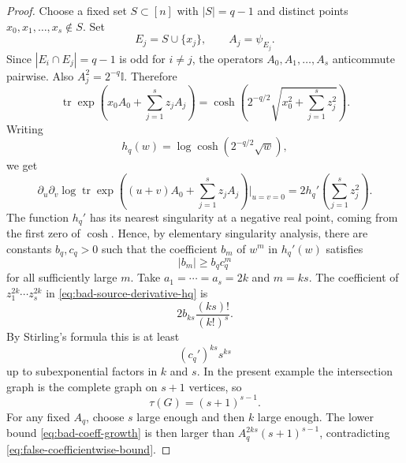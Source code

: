 \documentclass[11pt]{article}
\newcommand{\tr}{\operatorname{tr}}
\newcommand{\I}{\mathbb{I}}
\begin{document}
\begin{proof}
  Choose a fixed set $S\subset[n]$ with $|S|=q-1$ and distinct points
  $x_0,x_1,\ldots,x_s\notin S$.  Set
  \begin{equation}\label{eq:bad-family-Ej}
    E_j=S\cup\{x_j\},
    \qquad
    A_j=\psi_{E_j}.
  \end{equation}
  Since $|E_i\cap E_j|=q-1$ is odd for $i\neq j$, the operators
  $A_0,A_1,\ldots,A_s$ anticommute pairwise.  Also $A_j^2=2^{-q}\I$.
  Therefore
  \begin{equation}\label{eq:anticommuting-cosh}
    \tr\exp\left(x_0A_0+\sum_{j=1}^s z_jA_j\right)
    =
    \cosh\left(
      2^{-q/2}
      \sqrt{x_0^2+\sum_{j=1}^s z_j^2}
    \right).
  \end{equation}
  Writing
  \begin{equation}\label{eq:hq-def}
    h_q(w)=\log\cosh\left(2^{-q/2}\sqrt w\right),
  \end{equation}
  we get
  \begin{equation}\label{eq:bad-source-derivative-hq}
    \partial_u\partial_v
    \log\tr\exp\left(
      (u+v)A_0+\sum_{j=1}^s z_jA_j
    \right)\bigg|_{u=v=0}
    =
    2h_q'\left(\sum_{j=1}^s z_j^2\right).
  \end{equation}
  The function $h_q'$ has its nearest singularity at a negative real point,
  coming from the first zero of $\cosh$.  Hence, by elementary singularity
  analysis, there are constants $b_q,c_q>0$ such that the coefficient $b_m$ of
  $w^m$ in $h_q'(w)$ satisfies
  \begin{equation}\label{eq:hq-coeff-lower}
    |b_m|\geq b_q c_q^m
  \end{equation}
  for all sufficiently large $m$.
  Take $a_1=\cdots=a_s=2k$ and $m=ks$.  The coefficient of
  $z_1^{2k}\cdots z_s^{2k}$ in \eqref{eq:bad-source-derivative-hq} is
  \begin{equation}\label{eq:multinomial-bad-coeff}
    2b_{ks}\frac{(ks)!}{(k!)^s}.
  \end{equation}
  By Stirling's formula this is at least
  \begin{equation}\label{eq:bad-coeff-growth}
    (c_q')^{ks}s^{ks}
  \end{equation}
  up to subexponential factors in $k$ and $s$.  In the present example the
  intersection graph is the complete graph on $s+1$ vertices, so
  \begin{equation}\label{eq:complete-tree-count}
    \tau(G)=(s+1)^{s-1}.
  \end{equation}
  For any fixed $A_q$, choose $s$ large enough and then $k$ large enough.  The
  lower bound \eqref{eq:bad-coeff-growth} is then larger than
  $A_q^{2ks}(s+1)^{s-1}$, contradicting
  \eqref{eq:false-coefficientwise-bound}.
\end{proof}
\end{document}
